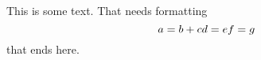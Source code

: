This is some text.
That needs formatting
\[
    a = b + c \\%
    d = e \\%
    f = g
\]
that ends here.

